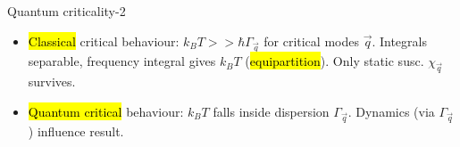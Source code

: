 {\begin{frame}[label=quancrit2]{Quantum criticality-2}
\begin{itemize}
\item<3->
  \hl{Classical} critical behaviour: $k_B T >> \hbar \Gamma_\vec q$ for
  critical modes $\vec q$.  Integrals separable, frequency integral
  gives $k_B T$ (\hl{equipartition}). Only static susc.  $\chi_\vec q$
  survives.  

\item<4->
  \hl{Quantum critical} behaviour: $k_B T$ falls inside dispersion
  $\Gamma_\vec q$.  Dynamics (via $\Gamma_\vec q$) influence result.
\end{itemize}

\end{frame}
}

